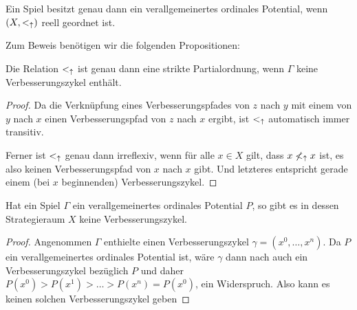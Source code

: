 \begin{satz}\label{satz:CharVerallOrdPot}
	Ein Spiel besitzt genau dann ein verallgemeinertes ordinales Potential, wenn $(X, <_\uparrow)$ reell geordnet ist.
\end{satz}

Zum Beweis benötigen wir die folgenden Propositionen:
\begin{prop}\label{prop:VerRelPartOrdVerbz}
	Die Relation $<_\uparrow$ ist genau dann eine strikte Partialordnung, wenn $\Gamma$ keine Verbesserungszykel enthält.
\end{prop}

\begin{proof}
	Da die Verknüpfung eines Verbesserungspfades von $z$ nach $y$ mit einem von $y$ nach $x$ einen Verbesserungspfad von $z$ nach $x$ ergibt, ist $<_\uparrow$ automatisch immer transitiv.
	
	Ferner ist $<_\uparrow$ genau dann irreflexiv, wenn für alle $x \in X$ gilt, dass $x \not<_\uparrow x$ ist, es also keinen Verbesserungspfad von $x$ nach $x$ gibt. Und letzteres entspricht gerade einem (bei $x$ beginnenden) Verbesserungszykel.
\end{proof}

\begin{prop}\label{prop:VerOrdPotKeineVBZ}
	Hat ein Spiel $\Gamma$ ein verallgemeinertes ordinales Potential $P$, so gibt es in dessen Strategieraum $X$ keine Verbesserungszykel.
\end{prop}

\begin{proof}
	Angenommen $\Gamma$ enthielte einen Verbesserungszykel $\gamma = (x^0, \dots, x^n)$. Da $P$ ein verallgemeinertes ordinales Potential ist, wäre $\gamma$ dann nach  auch ein Verbesserungszykel bezüglich $P$ und daher $P(x^0) > P(x^1) > \dots > P(x^n) = P(x^0)$, ein Widerspruch. Also kann es keinen solchen Verbesserungszykel geben
\end{proof}


